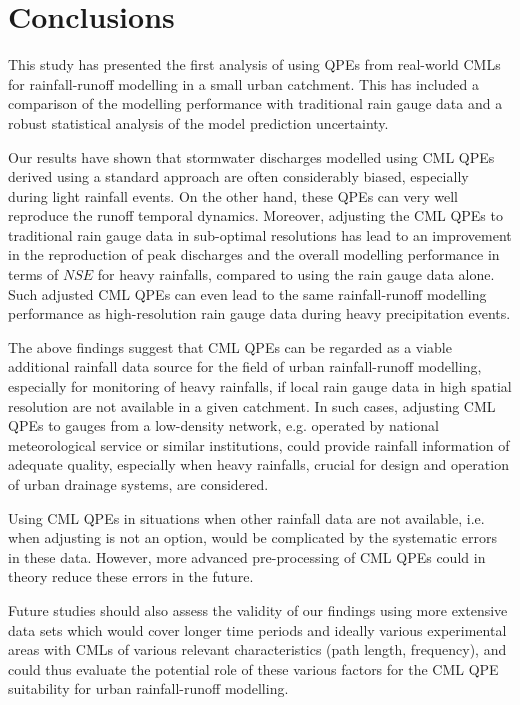 \documentclass{ctuthesis}\usepackage[]{graphicx}\usepackage[]{color}
\begin{document}
\section{Conclusions}

This study has presented the first analysis of using QPEs from real-world CMLs for rainfall-runoff modelling in a small urban catchment. This has included a comparison of the modelling performance with traditional rain gauge data and a robust statistical analysis of the model prediction uncertainty.

Our results have shown that stormwater discharges modelled using CML QPEs derived using a standard approach are often considerably biased, especially during light rainfall events. On the other hand, these QPEs can very well reproduce the runoff temporal dynamics. Moreover, adjusting the CML QPEs to traditional rain gauge data in sub-optimal resolutions has lead to an improvement in the reproduction of peak discharges and the overall modelling performance in terms of $N\!S\!E$ for heavy rainfalls, compared to using the rain gauge data alone. Such adjusted CML QPEs can even lead to the same rainfall-runoff modelling performance as high-resolution rain gauge data during heavy precipitation events.

The above findings suggest that CML QPEs can be regarded as a viable additional rainfall data source
for the field of urban rainfall-runoff modelling, especially for monitoring of heavy rainfalls, if local rain gauge data in high spatial resolution are not available in a given catchment. In such cases, adjusting CML QPEs to gauges from a low-density network, e.g. operated by national meteorological service or similar institutions, could provide rainfall information of adequate quality, especially when heavy rainfalls, crucial for design and operation of urban drainage systems, are considered.

Using CML QPEs in situations when other rainfall data are not available, i.e. when adjusting is not an option, would be complicated by the systematic errors in these data. However, more advanced pre-processing of CML QPEs could in theory reduce these errors in the future.

Future studies should also assess the validity of our findings using more extensive data sets which would cover longer time periods and ideally various experimental areas with CMLs of various relevant characteristics (path length, frequency), and could thus evaluate the potential role of these various factors for the CML QPE suitability for urban rainfall-runoff modelling.
\end{document}
